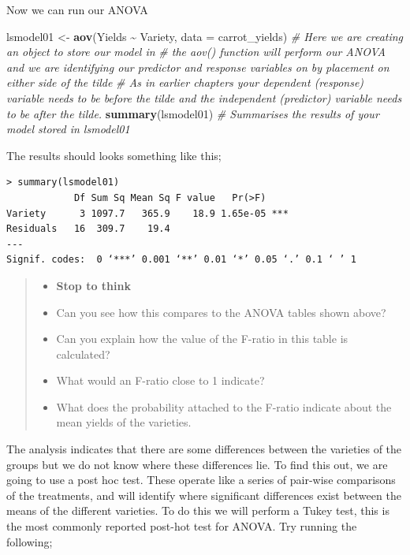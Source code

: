 \documentclass[
]{book}
\newenvironment{Shaded}{\begin{snugshade}}{\end{snugshade}}
\newcommand{\AttributeTok}[1]{\textcolor[rgb]{0.13,0.29,0.53}{#1}}
\newcommand{\CommentTok}[1]{\textcolor[rgb]{0.56,0.35,0.01}{\textit{#1}}}
\newcommand{\FunctionTok}[1]{\textcolor[rgb]{0.13,0.29,0.53}{\textbf{#1}}}
\newcommand{\NormalTok}[1]{#1}
\newcommand{\OtherTok}[1]{\textcolor[rgb]{0.56,0.35,0.01}{#1}}
\newcommand{\SpecialCharTok}[1]{\textcolor[rgb]{0.81,0.36,0.00}{\textbf{#1}}}
\providecommand{\tightlist}{%
  \setlength{\itemsep}{0pt}\setlength{\parskip}{0pt}}
\begin{document}
Now we can run our ANOVA

\begin{Shaded}
\begin{Highlighting}[]
\NormalTok{lsmodel01 }\OtherTok{\textless{}{-}} \FunctionTok{aov}\NormalTok{(Yields }\SpecialCharTok{\textasciitilde{}}\NormalTok{ Variety, }\AttributeTok{data =}\NormalTok{ carrot\_yields)}
\CommentTok{\# Here we are creating an object to store our model in }
\CommentTok{\# the aov() function will perform our ANOVA and we are identifying our predictor and response variables on by placement on either side of the tilde }
\CommentTok{\# As in earlier chapters your dependent (response) variable needs to be before the tilde and the independent (predictor) variable needs to be after the tilde.}
\FunctionTok{summary}\NormalTok{(lsmodel01)}
\CommentTok{\# Summarises the results of your model stored in lsmodel01}
\end{Highlighting}
\end{Shaded}

The results should looks something like this;

\begin{verbatim}
> summary(lsmodel01)
            Df Sum Sq Mean Sq F value   Pr(>F)    
Variety      3 1097.7   365.9    18.9 1.65e-05 ***
Residuals   16  309.7    19.4                     
---
Signif. codes:  0 ‘***’ 0.001 ‘**’ 0.01 ‘*’ 0.05 ‘.’ 0.1 ‘ ’ 1
\end{verbatim}

\begin{quote}
\begin{itemize}
\tightlist
\item
  \textbf{Stop to think}
\item
  Can you see how this compares to the ANOVA tables shown above?
\item
  Can you explain how the value of the F-ratio in this table is calculated?
\item
  What would an F-ratio close to 1 indicate?
\item
  What does the probability attached to the F-ratio indicate about the mean yields of the varieties.
\end{itemize}
\end{quote}

The analysis indicates that there are some differences between the varieties of the groups but we do not know where these differences lie. To find this out, we are going to use a post hoc test. These operate like a series of pair-wise comparisons of the treatments, and will identify where significant differences exist between the means of the different varieties. To do this we will perform a Tukey test, this is the most commonly reported post-hot test for ANOVA. Try running the following;
\end{document}
